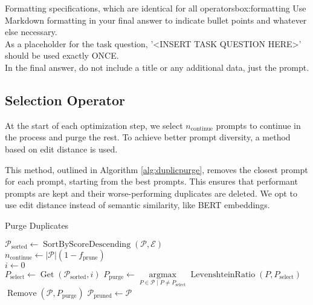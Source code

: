 \begin{figurebox}{Formatting specifications, which are identical for all operators}{box:formatting}
    Use Markdown formatting in your final answer to indicate bullet points and whatever else necessary.\\
    As a placeholder for the task question, '<INSERT TASK QUESTION HERE>' should be used exactly ONCE.\\
    In the final answer, do not include a title or any additional data, just the prompt.
\end{figurebox}

\subsection{Selection Operator}
At the start of each optimization step, we select $n_{\text{continue}}$ prompts to continue in the process and purge the rest. 
To achieve better prompt diversity, a method based on edit distance is used. 

This method, outlined in Algorithm \ref{alg:duplicpurge},
removes the closest prompt for each prompt, starting from the best prompts. This ensures that performant prompts are kept and their worse-performing duplicates are deleted.
We opt to use edit distance instead of semantic similarity, like BERT embeddings.

\begin{algorithm}
    \caption{Purge Duplicates}
    \label{alg:duplicpurge}
    $\mathscr{P}_{\text{sorted}} \gets \operatorname{SortByScoreDescending}(\mathscr{P}, \mathcal{E})$ \\
    $n_{\text{continue}} \gets \vert\mathscr{P}\vert(1-f_{\text{prune}})$ \\
    $i \gets 0$ \\
     {
        $P_{\text{select}} \gets \operatorname{Get}(\mathscr{P}_{\text{sorted}}, i)$ 
        $P_{\text{purge}} \gets \underset{P\in\mathscr{P}\mid P \neq P_{\text{select}}}{\operatorname{argmax}} \operatorname{LevenshteinRatio}(P, P_{\text{select}})$ \\
        $\operatorname{Remove}(\mathscr{P}, P_{\text{purge}})$
    }
    $\mathscr{P}_{\text{pruned}} \gets \mathscr{P}$\\
\end{algorithm}
